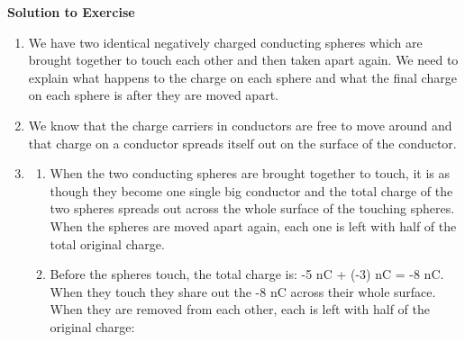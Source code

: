 {\begin{mdframed}[linewidth=4, leftmargin=40, rightmargin=40]
\begin{exercise}
      
      \vspace{5pt}
      \label{m38781*solfhsst!!!underscore!!!id301}\noindent\textbf{Solution to Exercise } \label{m38781*listfhsst!!!underscore!!!id301}\begin{enumerate}[noitemsep, label=\textbf{Step} \textbf{\arabic*}. ] 
            \leftskip=20pt\rightskip=\leftskip\item  
      \label{m38781*id201406}We have two identical negatively charged conducting spheres which are brought together to touch each other and then taken apart again. We need to explain what happens to the charge on each sphere and what the final charge on each sphere is after they are moved apart.\par 
      \item  
      \label{m38781*id201416}We know that the charge carriers in conductors are free to move around and that charge on a conductor spreads itself out on the surface of the conductor.\par 
      \item  
      \label{m38781*id201425}\begin{enumerate}[noitemsep, label=\textbf{\alph*}. ] 
            \leftskip=20pt\rightskip=\leftskip\label{m38781*uid9}\item When the two conducting spheres are brought together to touch, it is as though they become one single big conductor and the total charge of the two spheres spreads out across the whole surface of the touching spheres. When the spheres are moved apart again, each one is left with half of the total original charge.
\label{m38781*uid10}\item Before the spheres touch, the total charge is: -5 nC + (-3) nC = -8 nC. When they touch they share out the -8 nC across their whole surface. When they are removed from each other, each is left with half of the original charge:
\label{m38781*id201455}\nopagebreak\noindent{}
    \ifthenelse{\lengthtest{\mymathboxwidth < \columnwidth}}{%
    \begin{equation}

\end{equation}}
\end{enumerate}
\end{enumerate}
\end{exercise}
\end{mdframed}}
